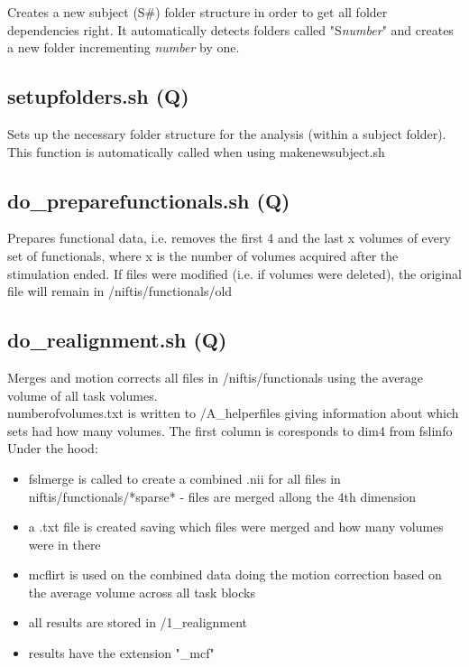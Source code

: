 \documentclass[12pt,a4paper]{scrartcl}
\begin{document}
Creates a new subject (S\#) folder structure in order to get all folder dependencies right. It automatically detects folders called "S\textit{number}" and creates a new folder incrementing \textit{number} by one.

\subsection{setupfolders.sh (Q)}
Sets up the necessary folder structure for the analysis (within a subject folder). This function is automatically called when using makenewsubject.sh\\

\subsection{do\_preparefunctionals.sh (Q)}
\label{sec:prepfct}
Prepares functional data, i.e. removes the first 4 and the last x volumes of every set of functionals, where x is the number of volumes acquired after the stimulation ended. If files were modified (i.e. if volumes were deleted), the original file will remain in /niftis/functionals/old\\

\subsection{do\_realignment.sh (Q)}
\label{sec:realign}
Merges and motion corrects all files in /niftis/functionals using the average volume of all task volumes.\\

\noindent numberofvolumes.txt is written to /A\_helperfiles giving information about which sets had how many volumes. The first column is coresponds to dim4 from fslinfo\\

\noindent Under the hood:
\begin{itemize}
\item fslmerge is called to create a combined .nii for all files in niftis/functionals/*sparse* - files are merged allong the 4th dimension
\item a .txt file is created saving which files were merged and how many volumes were in there
\item mcflirt is used on the combined data doing the motion correction based on the average volume across all task blocks
\item all results are stored in /1\_realignment
\item results have the extension "\_mcf"
\end{itemize}
\end{document}
